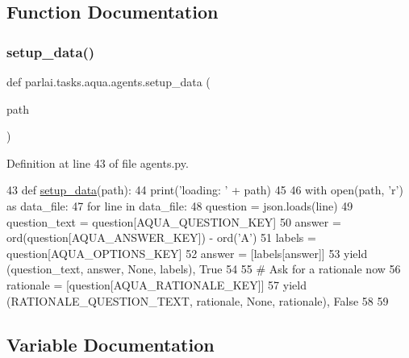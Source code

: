 \subsection{Function Documentation}
\mbox{\label{namespaceparlai_1_1tasks_1_1aqua_1_1agents_a2d4e9f4e80d4edc0646c7e3d52be9f25}} 
\subsubsection{\texorpdfstring{setup\+\_\+data()}{setup\_data()}}
{\footnotesize\ttfamily def parlai.\+tasks.\+aqua.\+agents.\+setup\+\_\+data (\begin{DoxyParamCaption}\item[{}]{path }\end{DoxyParamCaption})}



Definition at line 43 of file agents.\+py.


\begin{DoxyCode}
43 \textcolor{keyword}{def }\hyperlink{namespaceparlai_1_1tasks_1_1multinli_1_1agents_a4fa2cb0ba1ed745336ad8bceed36b841}{setup\_data}(path):
44     print(\textcolor{stringliteral}{'loading: '} + path)
45 
46     with open(path, \textcolor{stringliteral}{'r') as data\_file:}
47 \textcolor{stringliteral}{        }\textcolor{keywordflow}{for} line \textcolor{keywordflow}{in} data\_file:
48             question = json.loads(line)
49             question\_text = question[AQUA\_QUESTION\_KEY]
50             answer = ord(question[AQUA\_ANSWER\_KEY]) - ord(\textcolor{stringliteral}{'A'})
51             labels = question[AQUA\_OPTIONS\_KEY]
52             answer = [labels[answer]]
53             \textcolor{keywordflow}{yield} (question\_text, answer, \textcolor{keywordtype}{None}, labels), \textcolor{keyword}{True}
54 
55             \textcolor{comment}{# Ask for a rationale now}
56             rationale = [question[AQUA\_RATIONALE\_KEY]]
57             \textcolor{keywordflow}{yield} (RATIONALE\_QUESTION\_TEXT, rationale, \textcolor{keywordtype}{None}, rationale), \textcolor{keyword}{False}
58 
59 
\end{DoxyCode}


\subsection{Variable Documentation}
\mbox{\label{namespaceparlai_1_1tasks_1_1aqua_1_1agents_a4b9c5baa9cc806e9b791cc3dda957e1d}} 
